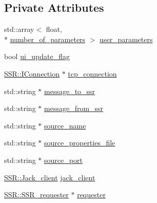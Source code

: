 \subsection*{Private Attributes}
\begin{DoxyCompactItemize}
\item 
std\-::array$<$ float, \\*
\hyperlink{classSsrSceneAutomationAudioProcessor_ae03aeb4847a435789be1b6112a7d92ddabf5efcb9cfd92164204c01d3516b51ae}{number\-\_\-of\-\_\-parameters} $>$ \hyperlink{classSsrSceneAutomationAudioProcessor_a65db1e242ec5ba4a421619efa63cd9ee}{user\-\_\-parameters}
\item 
bool \hyperlink{classSsrSceneAutomationAudioProcessor_afed1df18714184953906f47aaa174797}{ui\-\_\-update\-\_\-flag}
\item 
\hyperlink{classSSR_1_1IConnection}{S\-S\-R\-::\-I\-Connection} $\ast$ \hyperlink{classSsrSceneAutomationAudioProcessor_a583eadabeda7280aa6c4bfcc3de871d1}{tcp\-\_\-connection}
\item 
std\-::string $\ast$ \hyperlink{classSsrSceneAutomationAudioProcessor_a1b5359f318acfbe073ba294a974d2620}{message\-\_\-to\-\_\-ssr}
\item 
std\-::string $\ast$ \hyperlink{classSsrSceneAutomationAudioProcessor_a65e29a4ddbaeb3659895ac0191299fa5}{message\-\_\-from\-\_\-ssr}
\item 
std\-::string $\ast$ \hyperlink{classSsrSceneAutomationAudioProcessor_a6224b4d4a4617b35dc1e2861cb8057cb}{source\-\_\-name}
\item 
std\-::string $\ast$ \hyperlink{classSsrSceneAutomationAudioProcessor_a9e35e41e3f46e62c6f34712831d5eda0}{source\-\_\-properties\-\_\-file}
\item 
std\-::string $\ast$ \hyperlink{classSsrSceneAutomationAudioProcessor_aa81d7065ff2247c0df43bf80f4db5198}{source\-\_\-port}
\item 
\hyperlink{classSSR_1_1Jack__client}{S\-S\-R\-::\-Jack\-\_\-client} \hyperlink{classSsrSceneAutomationAudioProcessor_a77e39471c75bf35dc14b7cee9fb55130}{jack\-\_\-client}
\item 
\hyperlink{classSSR_1_1SSR__requester}{S\-S\-R\-::\-S\-S\-R\-\_\-requester} $\ast$ \hyperlink{classSsrSceneAutomationAudioProcessor_a7afa611e32e349dbc508592c607725a9}{requester}
\end{DoxyCompactItemize}


